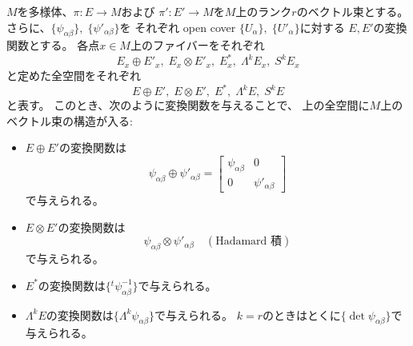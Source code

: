 \documentclass[report]{jlreq}
\begin{document}
\begin{definition}[代数的構成]
    $M$を多様体、$\pi \colon E \to M$および
    $\pi' \colon E' \to M$を$M$上のランク$r$のベクトル束とする。
    さらに、$\{\psi_{\alpha\beta}\},\; \{\psi'_{\alpha\beta}\}$を
    それぞれ open cover $\{ U_\alpha \},\; \{ U'_\alpha \}$に対する
    $E, E'$の変換関数とする。
    各点$x \in M$上のファイバーをそれぞれ
    \begin{equation}
        E_x \oplus E'_x,\;
        E_x \otimes E'_x,\;
        E_x^*,\;
        \Lambda^k E_x,\;
        S^k E_x
    \end{equation}
    と定めた全空間をそれぞれ
    \begin{equation}
        E \oplus E',\;
        E \otimes E',\;
        E^*,\;
        \Lambda^k E,\;
        S^k E
    \end{equation}
    と表す。
    このとき、次のように変換関数を与えることで、
    上の全空間に$M$上のベクトル束の構造が入る:
    \begin{itemize}
        \item $E \oplus E'$の変換関数は
            \begin{equation}
                \psi_{\alpha\beta} \oplus \psi'_{\alpha\beta}
                    = \begin{bmatrix}
                        \psi_{\alpha\beta} & 0 \\
                        0 & \psi'_{\alpha\beta}
                    \end{bmatrix}
            \end{equation}
            で与えられる。
        \item $E \otimes E'$の変換関数は
            \begin{equation}
                \psi_{\alpha\beta} \otimes \psi'_{\alpha\beta}
                \quad (\text{Hadamard 積})
            \end{equation}
            で与えられる。
        \item $E^*$の変換関数は$\{ {}^t\!\psi_{\alpha\beta}^{-1} \}$で与えられる。
        \item $\Lambda^k E$の変換関数は$\{ \Lambda^k \psi_{\alpha\beta} \}$で与えられる。
            $k = r$のときはとくに$\{ \det \psi_{\alpha\beta} \}$で与えられる。
    \end{itemize}
\end{definition}
\end{document}
